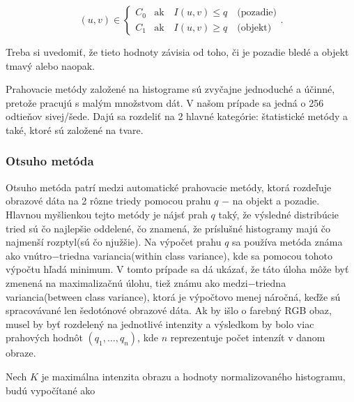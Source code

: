 \documentclass[a4paper,11pt,twoside]{article}%
\begin{document}
\begin{equation*}
(u, v) \in \begin{cases} C_0 & \text{ak} \hspace{1em} I(u,v) \leq q \hspace{1em} \text{(pozadie)} \\  C_1 & \text{ak} \hspace{1em} I(u,v) \geq q \hspace{1em} \text{(objekt)} \end{cases}.
\end{equation*}

Treba si uvedomiť, že tieto hodnoty závisia od toho, či je pozadie bledé a objekt tmavý alebo naopak.

Prahovacie metódy založené na histograme sú zvyčajne jednoduché a účinné, pretože pracujú s malým množstvom dát. V našom prípade sa jedná o 256 odtieňov sivej/šede. Dajú sa rozdeliť na 2 hlavné kategórie: štatistické metódy a také, ktoré sú založené na tvare.


\subsubsection{Otsuho metóda}
Otsuho metóda patrí medzi automatické  prahovacie metódy, ktorá rozdeľuje obrazové dáta na 2 rôzne triedy pomocou prahu $q$ $-$ na objekt a pozadie. Hlavnou myšlienkou tejto metódy je nájsť prah $q$ taký, že výsledné distribúcie tried sú čo najlepšie oddelené, čo znamená, že príslušné histogramy majú čo najmenší rozptyl(sú čo njužšie). Na výpočet prahu $q$ sa používa metóda známa ako vnútro$-$triedna variancia(within class variance), kde sa pomocou tohoto výpočtu hľadá minimum. V tomto prípade sa dá ukázať, že táto úloha môže byť zmenená na maximalizačnú úlohu, tiež známu ako medzi$-$triedna variancia(between class variance), ktorá je výpočtovo menej náročná, keďže sú spracovávané len šedotónové obrazové dáta. Ak by išlo o farebný RGB obaz, musel by byť rozdelený na jednotlivé intenzity a výsledkom by bolo viac prahových hodnôt $(q_1, \ldots, q_n)$, kde $n$ reprezentuje počet intenzít v danom obraze.

Nech $K$ je maximálna intenzita obrazu a hodnoty normalizovaného histogramu, budú vypočítané ako
\end{document}
